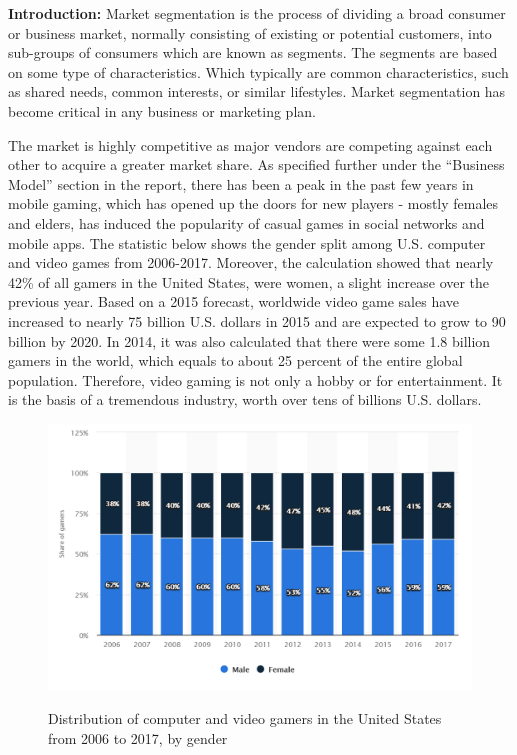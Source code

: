 \documentclass[12p]{article}
\begin{document}
\textbf{Introduction:} Market segmentation is the process of dividing a broad consumer or business market, normally consisting of existing or potential customers, into sub-groups of consumers which are known as segments. The segments are based on some type of characteristics. Which typically are common characteristics, such as shared needs, common interests, or similar lifestyles. Market segmentation has become critical in any business or marketing plan. \cite{MarketSegmentation}

The market is highly competitive as major vendors are competing against each other to acquire a greater market share.  As specified further under the “Business Model” section  in the report, there has been a peak in the past few years in mobile gaming, which has opened up the doors for new players - mostly females and elders, has induced the popularity of casual games in social networks and mobile apps. The statistic below shows the gender split among U.S. computer and video games from 2006-2017. Moreover, the calculation showed that nearly 42\% of all gamers in the United States, were women, a slight increase over the previous year. Based on a 2015 forecast, worldwide video game sales have increased to nearly 75 billion U.S. dollars in 2015 and are expected to grow to 90 billion by 2020.
In 2014, it was also calculated that there were some 1.8 billion gamers in the world, which equals to about 25 percent of the entire global population. Therefore, video gaming is not only a hobby or for entertainment. It is the basis of a tremendous industry, worth over tens of billions U.S. dollars.\cite{VideoGamerGender}

\begin{figure}[ht]
  \center
  \includegraphics[width=1\textwidth]{BusinessStrategy/Statistics-MarketSeg}
  \label{Statistcs-MarketSeg}
  \caption{Distribution of computer and video gamers in the United States from 2006 to 2017, by gender \cite{NezooScreenshot}}
\end{figure}
\end{document}
